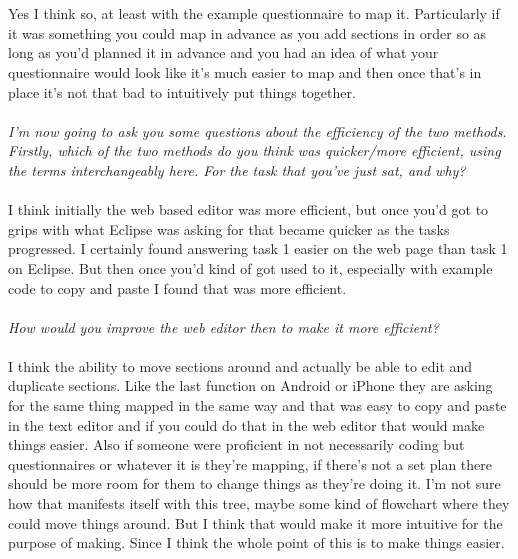 \\
\\
Yes I think so, at least with the example questionnaire to map it. Particularly if it was something you could map in advance as you add sections in order so as long as you'd planned it in advance and you had an idea of what your questionnaire would look like it's much easier to map and then once that's in place it's not that bad to intuitively put things together.
\\
\\
\textit{I'm now going to ask you some questions about the efficiency of the two methods. Firstly, which of the two methods do you think was quicker/more efficient, using the terms interchangeably here. For the task that you've just sat, and why?}                                                                                                                                                                                                                                                                \\
\\
I think initially the web based editor was more efficient, but once you'd got to grips with what Eclipse was asking for that became quicker as the tasks progressed. I certainly found answering task 1 easier on the web page than task 1 on Eclipse. But then once you'd kind of got used to it, especially with example code to copy and paste I found that was more efficient.
\\
\\
\textit{How would you improve the web editor then to make it more efficient?}
\\
\\
I think the ability to move sections around and actually be able to edit and duplicate sections. Like the last function on Android or iPhone they are asking for the same thing mapped in the same way and that was easy to copy and paste in the text editor and if you could do that in the web editor that would make things easier. Also if someone were proficient in not necessarily coding but questionnaires or whatever it is they're mapping, if there's not a set plan there should be more room for them to change things as they're doing it. I'm not sure how that manifests itself with this tree, maybe some kind of flowchart where they could move things around. But I think that would make it more intuitive for the purpose of making. Since I think the whole point of this is to make things easier.
\\
\\
